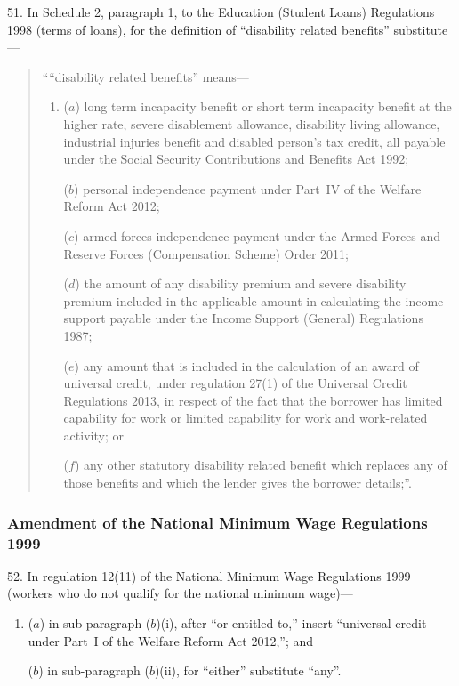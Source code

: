 \documentclass[12pt,a4paper]{article}
\begin{document}
51.  In Schedule 2, paragraph 1, to the Education (Student Loans) Regulations 1998 (terms of loans), for the definition of “disability related benefits” substitute—
\begin{quotation}
““disability related benefits” means—
\begin{enumerate}\item[]
($a$) 
long term incapacity benefit or short term incapacity benefit at the higher rate, severe disablement allowance, disability living allowance, industrial injuries benefit and disabled person’s tax credit, all payable under the Social Security Contributions and Benefits Act 1992;

($b$) 
personal independence payment under Part~IV of the Welfare Reform Act 2012;

($c$) 
armed forces independence payment under the Armed Forces and Reserve Forces (Compensation Scheme) Order 2011;

($d$) 
the amount of any disability premium and severe disability premium included in the applicable amount in calculating the income support payable under the Income Support (General) Regulations 1987;

($e$) 
any amount that is included in the calculation of an award of universal credit, under regulation 27(1) of the Universal Credit Regulations 2013, in respect of the fact that the borrower has limited capability for work or limited capability for work and work-related activity; or

($f$) 
any other statutory disability related benefit which replaces any of those benefits and which the lender gives the borrower details;”.
\end{enumerate}
\end{quotation}

\subsubsection[52. Amendment of the National Minimum Wage Regulations 1999]{Amendment of the National Minimum Wage Regulations 1999}

52.  In regulation 12(11) of the National Minimum Wage Regulations 1999 (workers who do not qualify for the national minimum wage)—
\begin{enumerate}\item[]
($a$) in sub-paragraph ($b$)(i), after “or entitled to,” insert “universal credit under Part~I of the Welfare Reform Act 2012,”; and

($b$) in sub-paragraph ($b$)(ii), for “either” substitute “any”.
\end{enumerate}
\end{document}
